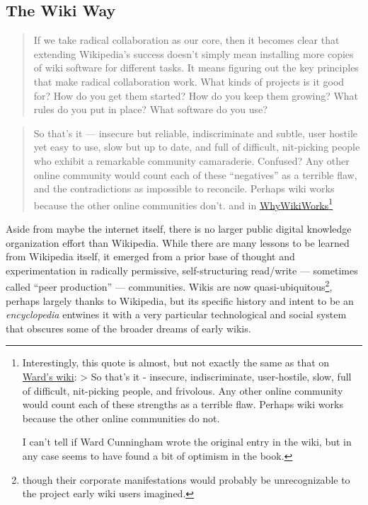 \hypertarget{the-wiki-way}{%
\subsection{The Wiki Way}\label{the-wiki-way}}

\begin{quote}
If we take radical collaboration as our core, then it becomes clear that
extending Wikipedia's success doesn't simply mean installing more copies
of wiki software for different tasks. It means figuring out the key
principles that make radical collaboration work. What kinds of projects
is it good for? How do you get them started? How do you keep them
growing? What rules do you put in place? What software do you use? \citep{swartzMakingMoreWikipedias2006} 
\end{quote}

\begin{quote}
So that's it --- insecure but reliable, indiscriminate and subtle, user
hostile yet easy to use, slow but up to date, and full of difficult,
nit-picking people who exhibit a remarkable community camaraderie.
Confused? Any other online community would count each of these
``negatives'' as a terrible flaw, and the contradictions as impossible
to reconcile. Perhaps wiki works because the other online communities
don't. \citep{leufWikiWayQuick2001a, -l, 329}  and in
\href{http://wiki.c2.com/?WhyWikiWorks}{WhyWikiWorks}\footnote{Interestingly,
  this quote is almost, but not exactly the same as that on
  \href{http://wiki.c2.com/?WhyWikiWorks}{Ward's wiki}: \textgreater{}
  So that's it - insecure, indiscriminate, user-hostile, slow, full of
  difficult, nit-picking people, and frivolous. Any other online
  community would count each of these strengths as a terrible flaw.
  Perhaps wiki works because the other online communities do not.

  I can't tell if Ward Cunningham wrote the original entry in the wiki,
  but in any case seems to have found a bit of optimism in the book.}
\end{quote}

Aside from maybe the internet itself, there is no larger public digital
knowledge organization effort than Wikipedia. While there are many
lessons to be learned from Wikipedia itself, it emerged from a prior
base of thought and experimentation in radically permissive,
self-structuring read/write --- sometimes called ``peer production''
\citep{hillWikipediaEndOpen2019}  --- communities. Wikis are now
quasi-ubiquitous\footnote{though their corporate manifestations would
  probably be unrecognizable to the project early wiki users imagined.},
perhaps largely thanks to Wikipedia, but its specific history and intent
to be an \emph{encyclopedia} entwines it with a very particular
technological and social system that obscures some of the broader dreams
of early wikis.

